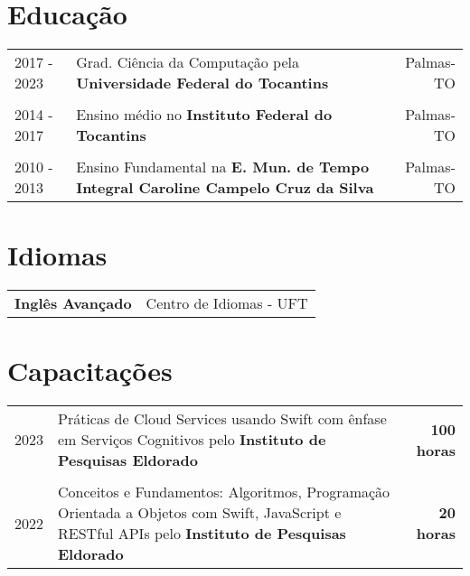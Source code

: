 \documentclass[a4paper,12pt]{article}
\begin{document}
\section{Educação}
\begin{tabularx}{\linewidth}{lXr}	
2017 - 2023 & Grad. Ciência da Computação pela \textbf{Universidade Federal do Tocantins} & Palmas-TO \\\\

2014 - 2017 & Ensino médio no \textbf{Instituto Federal do Tocantins} & Palmas-TO \\ \\

2010 - 2013 & Ensino Fundamental na \textbf{E. Mun. de Tempo Integral Caroline Campelo Cruz da Silva} & Palmas-TO \\ 
\end{tabularx}


\section{Idiomas}
\begin{tabularx}{\linewidth}{@{}l X@{}}
\textbf{Inglês Avançado} & \hfill Centro de Idiomas - UFT \\
\end{tabularx}

\section{Capacitações}
\begin{tabularx}{\linewidth}{lXr}	
2023 & Práticas de Cloud Services usando Swift com ênfase em Serviços Cognitivos pelo \textbf{Instituto de Pesquisas Eldorado} & \textbf{100 horas}\\\\

2022 & Conceitos e Fundamentos: Algoritmos, Programação Orientada a Objetos com Swift, JavaScript e RESTful APIs pelo \textbf{Instituto de Pesquisas Eldorado} & \textbf{20 horas}\\ 
\end{tabularx}
\end{document}
